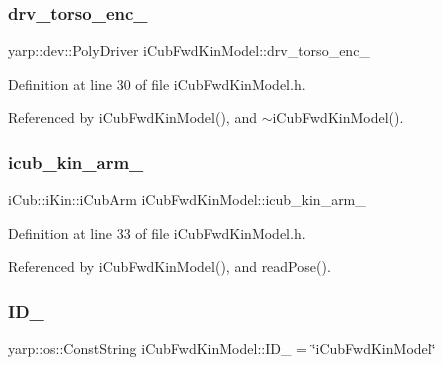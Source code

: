 \subsubsection{\texorpdfstring{drv\+\_\+torso\+\_\+enc\+\_\+}{drv\_torso\_enc\_}}
{\footnotesize\ttfamily yarp\+::dev\+::\+Poly\+Driver i\+Cub\+Fwd\+Kin\+Model\+::drv\+\_\+torso\+\_\+enc\+\_\+\hspace{0.3cm}{\ttfamily [protected]}}



Definition at line 30 of file i\+Cub\+Fwd\+Kin\+Model.\+h.



Referenced by i\+Cub\+Fwd\+Kin\+Model(), and $\sim$i\+Cub\+Fwd\+Kin\+Model().

\mbox{\label{classiCubFwdKinModel_a4b92808d2c83eaff8a3bf18dede7001a}} 
\subsubsection{\texorpdfstring{icub\+\_\+kin\+\_\+arm\+\_\+}{icub\_kin\_arm\_}}
{\footnotesize\ttfamily i\+Cub\+::i\+Kin\+::i\+Cub\+Arm i\+Cub\+Fwd\+Kin\+Model\+::icub\+\_\+kin\+\_\+arm\+\_\+\hspace{0.3cm}{\ttfamily [protected]}}



Definition at line 33 of file i\+Cub\+Fwd\+Kin\+Model.\+h.



Referenced by i\+Cub\+Fwd\+Kin\+Model(), and read\+Pose().

\mbox{\label{classiCubFwdKinModel_a3eb6c400ef775a5549aa31fe22fae4c0}} 
\subsubsection{\texorpdfstring{I\+D\+\_\+}{ID\_}}
{\footnotesize\ttfamily yarp\+::os\+::\+Const\+String i\+Cub\+Fwd\+Kin\+Model\+::\+I\+D\+\_\+ = \char`\"{}i\+Cub\+Fwd\+Kin\+Model\char`\"{}\hspace{0.3cm}{\ttfamily [private]}}



